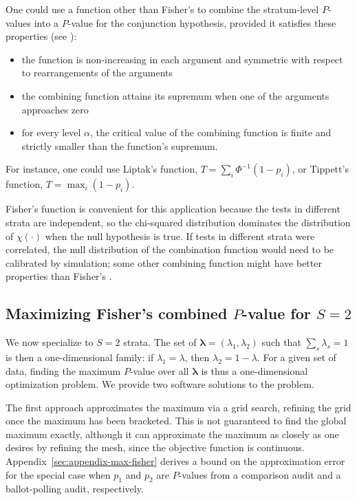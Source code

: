 \documentclass[runningheads]{llncs}
\begin{document}
One could use a function other than Fisher's to combine the stratum-level $P$-values into a $P$-value for the conjunction hypothesis, provided it satisfies these properties (see \cite{pesarinSalmaso10}):
\begin{itemize}
  \item the function is non-increasing in each argument and symmetric with respect to rearrangements of the arguments
  \item the combining function attains its supremum when one of the arguments approaches zero
  \item for every level $\alpha$, the critical value of the combining function is finite and strictly smaller than the function's supremum.
\end{itemize}
For instance, one could use Liptak's function, $T = \sum_i \Phi^{-1}(1-p_i)$,
or Tippett's function, $T = \max_i (1-p_i)$.

Fisher's function is convenient for this application because the tests in different strata are independent, so the chi-squared distribution dominates the distribution of $\chi(\cdot)$ when the null hypothesis is true.
If tests in different strata were correlated, the null distribution of the combination function would need to be calibrated by simulation; some other combining function might have better properties than Fisher's \cite{pesarinSalmaso10}.


\subsection{Maximizing Fisher's combined $P$-value for $S=2$}
We now specialize to $S=2$ strata.
The set of $\mathbf{\lambda} = (\lambda_1, \lambda_2)$ such that $\sum_s \lambda_s = 1$ is then a one-dimensional family: if $\lambda_1 = \lambda$, then $\lambda_2 = 1-\lambda$.
For a given set of data, finding the maximum $P$-value over all $\mathbf{\lambda}$
is thus a one-dimensional optimization problem.
We provide two software solutions to the problem.

The first approach approximates the maximum via a grid search, refining the
grid once the maximum has been bracketed.
This is not guaranteed to find the global maximum exactly, although it can approximate 
the maximum as closely as one desires by refining the mesh, since the objective function is continuous.
Appendix~\ref{sec:appendix-max-fisher} derives a bound on the approximation error for the special
case when $p_1$ and $p_2$ are $P$-values from a comparison audit and a ballot-polling audit, respectively.
\end{document}
